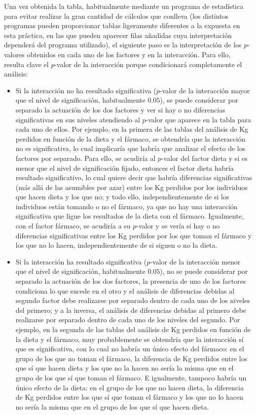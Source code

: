 Una vez obtenida la tabla, habitualmente mediante un programa de estadística para evitar realizar la gran cantidad de
cálculos que conlleva (los distintos programas pueden proporcionar tablas ligeramente diferentes a la expuesta en esta
práctica, en las que pueden aparecer filas añadidas cuya interpretación dependerá del programa utilizado), el siguiente
paso es la interpretación de los $p$-valores obtenidos en cada uno de los factores y en la interacción. Para ello,
resulta clave el $p$-valor de la interacción porque condicionará completamente el análisis:
\begin{itemize}
\item Si la interacción no ha resultado significativa ($p$-valor de la interacción mayor que el nivel de significación,
habitualmente $0.05$), se puede considerar por separado la actuación de los dos factores y ver si hay o no diferencias
significativas en sus niveles atendiendo al $p$-valor que aparece en la tabla para cada uno de ellos. Por ejemplo, en la
primera de las tablas del análisis de Kg perdidos en función de la dieta y el fármaco, se obtendría que la interacción
no es significativa, lo cual implicaría que habría que analizar el efecto de los factores por separado. Para ello, se
acudiría al $p$-valor del factor dieta y si es menor que el nivel de significación fijado, entonces el factor dieta
habría resultado significativo, lo cual quiere decir que habría diferencias significativas (más allá de las asumibles
por azar) entre los Kg perdidos por los individuos que hacen dieta y los que no; y todo ello, independientemente de si
los individuos están tomando o no el fármaco, ya que no hay una interacción significativa que ligue los resultados de la
dieta con el fármaco.
Igualmente, con el factor fármaco, se acudiría a su $p$-valor y se vería si hay o no diferencias significativas entre
los Kg perdidos por los que toman el fármaco y los que no lo hacen, independientemente de si siguen o no la dieta.
\item Si la interacción ha resultado significativa ($p$-valor de la interacción menor que el nivel de significación,
habitualmente $0.05$), no se puede considerar por separado la actuación de los dos factores, la presencia de uno de los
factores condiciona lo que sucede en el otro y el análisis de diferencias debidas al segundo factor debe realizarse por
separado dentro de cada uno de los niveles del primero; y a la inversa, el análisis de diferencias debidas al primero
debe realizarse por separado dentro de cada uno de los niveles del segundo. Por ejemplo, en la segunda de las tablas del
análisis de Kg perdidos en función de la dieta y el fármaco, muy probablemente se obtendría que la interacción sí que es
significativa, con lo cual no habría un único efecto del fármaco: en el grupo de los que no toman el fármaco, la
diferencia de Kg perdidos entre los que sí que hacen dieta y los que no  la hacen no sería la misma que en el grupo de
los que sí que toman el fármaco. E igualmente, tampoco habría un único efecto de la dieta: en el grupo de los que no
hacen dieta, la diferencia de Kg perdidos entre los que sí que toman el fármaco y los que no lo hacen no sería la misma
que en el grupo de los que sí que hacen dieta.
\end{itemize}

